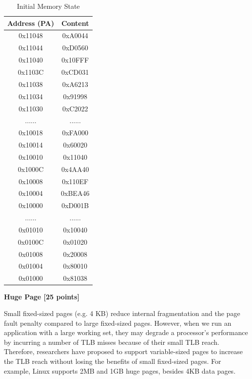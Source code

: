 \documentclass[addpoints, 12pt, answers]{exam}
\begin{document}
\begin{questions}
\begin{parts}
\begin{table}[H]
\begin{minipage}[t]{0.6\linewidth}
		\end{minipage}
	\begin{minipage}[t]{0.4\linewidth}
		\centering
		\caption{Initial Memory State}\label{tab:b:ini-mem}
		\begin{tabular}{|c|c|}
		\hline
		Address (PA) & \quad Content \quad\quad \\ \hline
		0x11048 & 0xA0044 \\ \hline
		0x11044 & 0xD0560 \\ \hline
		0x11040 & 0x10FFF \\ \hline
		0x1103C & 0xCD031 \\ \hline
		0x11038 & 0xA6213 \\ \hline
		0x11034 & 0x91998 \\ \hline
		0x11030 & 0xC2022 \\ \hline
		...... & ...... \\ \hline
		0x10018 & 0xFA000 \\ \hline
		0x10014 & 0x60020 \\ \hline
		0x10010 & 0x11040 \\ \hline
		0x1000C & 0x4AA40 \\ \hline
		0x10008 & 0x110EF \\ \hline
		0x10004 & 0xBEA46 \\ \hline
		0x10000 & 0xD001B \\ \hline
		...... & ...... \\ \hline
		0x01010 & 0x10040 \\ \hline
		0x0100C & 0x01020 \\ \hline
		0x01008 & 0x20008 \\ \hline
		0x01004 & 0x80010 \\ \hline
		0x01000 & 0x81038 \\ \hline
		\end{tabular}
		\end{minipage}
\end{table}




\end{parts}


\pagebreak
\question[25] \textbf{Huge Page [25 points]}

Small fixed-sized pages (e.g. 4 KB) reduce internal fragmentation and the page fault penalty
compared to large fixed-sized pages. 
However, when we run an application with a large working set, 
they may degrade a processor’s performance by incurring a number of TLB misses 
because of their small TLB reach. 
Therefore, researchers have proposed to support variable-sized pages
to increase the TLB reach without losing the benefits of small fixed-sized pages. 
For example, Linux supports 2MB and 1GB huge pages, besides 4KB data pages.



\end{questions}
\end{document}
